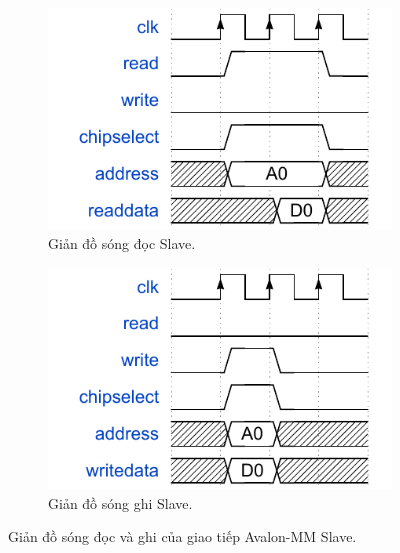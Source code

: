 \begin{itemize}
    \begin{figure}[htbp]
        \centering
        \begin{subfigure}[b]{0.48\textwidth}
            \centering
            \includegraphics[width=\linewidth]{Images/02_03_AvalonSlave_ReadWaveform.pdf}
            \caption{Giản đồ sóng đọc Slave.}
            \label{fig:02_03_avalon_slave_read_sub}
        \end{subfigure}
        \hfill
        \begin{subfigure}[b]{0.48\textwidth}
            \centering
            \includegraphics[width=\linewidth]{Images/02_04_AvalonSlave_WriteWaveform.pdf}
            \caption{Giản đồ sóng ghi Slave.}
            \label{fig:02_04_avalon_slave_write_sub}
        \end{subfigure}
        \caption{Giản đồ sóng đọc và ghi của giao tiếp Avalon-MM Slave.}
        \label{fig:avalon_slave_waveforms}
    \end{figure}


\end{itemize}
